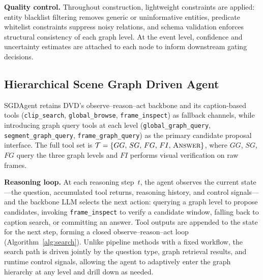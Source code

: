 \documentclass[sigconf, screen, review, anonymous]{acmart}
\begin{document}
\textbf{Quality control.}\quad
Throughout construction, lightweight constraints are applied: entity
blacklist filtering removes generic or uninformative entities, predicate
whitelist constraints suppress noisy relations, and schema validation
enforces structural consistency of each graph level.  At the event level,
confidence and uncertainty estimates are attached to each node to inform
downstream gating decisions.


\subsection{Hierarchical Scene Graph Driven Agent}
\label{sec:agent}

\begin{sloppypar}
SGDAgent retains DVD's observe--reason--act backbone and its caption-based
tools (\texttt{clip\_search}, \texttt{global\_browse},
\texttt{frame\_inspect}) as fallback channels, while introducing graph
query tools at each level (\texttt{global\_graph\_query},
\texttt{segment\_graph\_query}, \texttt{frame\_graph\_query}) as the
primary candidate proposal interface.  The full tool set is
$\mathcal{T}=\{GG,\,SG,\,FG,\,FI,\,\textsc{Answer}\}$, where $GG$,
$SG$, $FG$ query the three graph levels and $FI$ performs visual
verification on raw frames.
\end{sloppypar}

\textbf{Reasoning loop.}\quad
At each reasoning step~$t$, the agent observes the current state---the
question, accumulated tool returns, reasoning history, and control
signals---and the backbone LLM selects the next action: querying a graph
level to propose candidates, invoking \texttt{frame\_inspect} to verify a
candidate window, falling back to caption search, or committing an answer.
Tool outputs are appended to the state for the next step, forming a closed
observe--reason--act loop (Algorithm~\ref{alg:search}).  Unlike pipeline
methods with a fixed workflow, the search path is driven jointly by the
question type, graph retrieval results, and runtime control signals,
allowing the agent to adaptively enter the graph hierarchy at any level
and drill down as needed.
\end{document}
